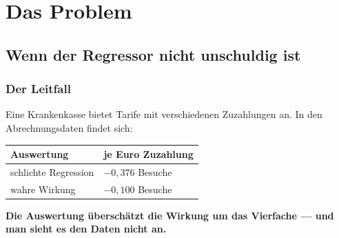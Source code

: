 \part{Das Problem}

\chapter{Wenn der Regressor nicht unschuldig ist}

\section{Der Leitfall}

\begin{merksatz}
Eine Krankenkasse bietet Tarife mit verschiedenen Zuzahlungen an. In den Abrechnungsdaten findet sich:

\begin{center}
{\small
\renewcommand{\arraystretch}{1.5}
\begin{tabular}{@{}P{3.6cm}P{2.6cm}@{}}
\toprule
\textbf{Auswertung} & \textbf{je Euro Zuzahlung}\\
\midrule
schlichte Regression & $-0{,}376$ Besuche\\
\midrule
wahre Wirkung & $-0{,}100$ Besuche\\
\bottomrule
\end{tabular}}
\end{center}

\begin{center}
\begin{minipage}{0.9\textwidth}
\textbf{Die Auswertung überschätzt die Wirkung um das Vierfache --- und man sieht es den Daten nicht an.}
\end{minipage}
\end{center}

\begin{center}
\begin{minipage}{0.88\textwidth}
\end{minipage}
\end{center}
\end{merksatz}

